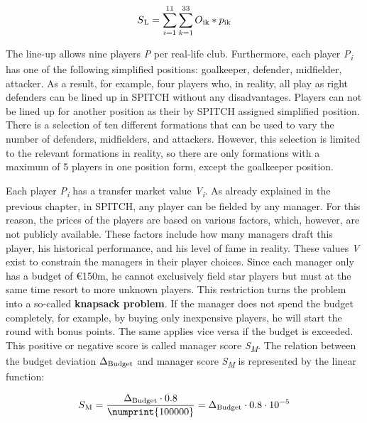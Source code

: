 \begin{equation}
    S\textsubscript{L} = \sum_{i=1}^{11} \sum_{k=1}^{33} O\textsubscript{ik} * p\textsubscript{ik}
    \label{eq:final_score_without_ms}
\end{equation}

The line-up allows nine players \emph{P} per real-life club. \parencite[cf.][]{spitch_rules_2021} Furthermore, each player \emph{P\textsubscript{i}} has one of the following simplified positions: goalkeeper, defender, midfielder, attacker. As a result, for example, four players who, in reality, all play as right defenders can be lined up in SPITCH without any disadvantages. Players can not be lined up for another position as their by SPITCH assigned simplified position. There is a selection of ten different formations that can be used to vary the number of defenders, midfielders, and attackers. However, this selection is limited to the relevant formations in reality, so there are only formations with a maximum of 5 players in one position form, except the goalkeeper position.

Each player \emph{P\textsubscript{i}} has a transfer market value \emph{V\textsubscript{i}}. As already explained in the previous chapter, in SPITCH, any player can be fielded by any manager. For this reason, the prices of the players are based on various factors, which, however, are not publicly available. These factors include how many managers draft this player, his historical performance, and his level of fame in reality. These values \emph{V} exist to constrain the managers in their player choices. Since each manager only has a budget of €150m, he cannot exclusively field star players but must at the same time resort to more unknown players. This restriction turns the problem into a so-called \textbf{knapsack problem}. If the manager does not spend the budget completely, for example, by buying only inexpensive players, he will start the round with bonus points. The same applies vice versa if the budget is exceeded. This positive or negative score is called manager score \emph{S\textsubscript{M}}. The relation between the budget deviation \emph{$ \Delta \textsubscript{Budget} $} and manager score \emph{S\textsubscript{M}} is represented by the linear function:

\begin{equation}
    S\textsubscript{M} = \frac{\Delta \textsubscript{Budget}\cdot0.8}{\numprint{100000}} = \Delta \textsubscript{Budget}\cdot0.8\cdot10^{-5}
    \label{eq:value_to_manager_score}
\end{equation}

